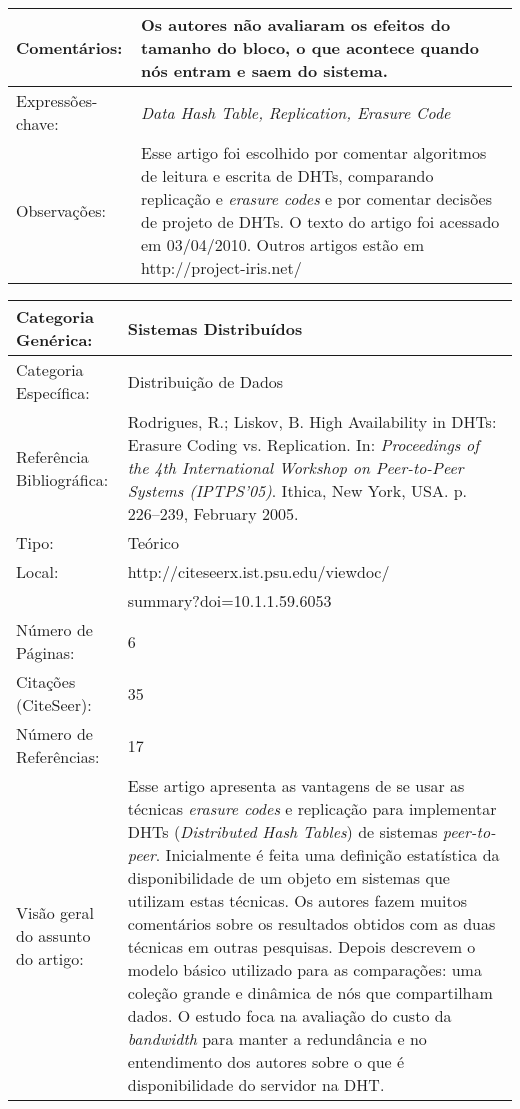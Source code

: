 \documentclass[10pt,a4paper]{article}
\begin{document}
\begin{center}
\begin{tabular}{|p{5cm}||p{10cm}|}
Comentários: & Os autores não avaliaram os efeitos do tamanho do bloco, o que acontece quando nós entram e saem do sistema. \\\hline
Expressões-chave: & \emph{Data Hash Table, Replication, Erasure Code}\\\hline
Observações: & Esse artigo foi escolhido por comentar algoritmos de leitura e escrita de DHTs, comparando replicação e \emph{erasure codes} e por comentar decisões de projeto de DHTs. O texto do artigo foi acessado em 03/04/2010. Outros artigos estão em http://project-iris.net/\\\hline

\end{tabular}
\end{center}

\begin{center}
\begin{tabular}{|p{5cm}||p{10cm}|}
\hline
Categoria Genérica: & Sistemas Distribuídos\\\hline
Categoria Específica: & Distribuição de Dados\\\hline
Referência Bibliográfica: & Rodrigues, R.; Liskov, B. High Availability in DHTs: Erasure Coding vs. Replication.
In: \emph{Proceedings of the 4th International Workshop on Peer-to-Peer Systems (IPTPS'05)}. Ithica, New York, USA. p. 226--239, February 2005.\\\hline
Tipo: & Teórico\\\hline
Local: & http://citeseerx.ist.psu.edu/viewdoc/\\ & summary?doi=10.1.1.59.6053\\\hline
Número de Páginas: & 6\\\hline
Citações (CiteSeer): & 35\\\hline
Número de Referências: & 17\\\hline
Visão geral do assunto do artigo: & Esse artigo apresenta as vantagens de se usar as técnicas \emph{erasure codes} e replicação para implementar DHTs (\emph{Distributed Hash Tables}) de sistemas \emph{peer-to-peer}. Inicialmente é feita uma definição estatística da disponibilidade de um objeto em sistemas que utilizam estas técnicas. Os autores fazem muitos comentários sobre os resultados obtidos com as duas técnicas em outras pesquisas. Depois descrevem o modelo básico utilizado para as comparações: uma coleção grande e dinâmica de nós que compartilham dados. O estudo foca na avaliação do custo da \emph{bandwidth} para manter a redundância e no entendimento dos autores sobre o que é disponibilidade do servidor na DHT. \\\hline

\end{tabular}
\end{center}
\end{document}
